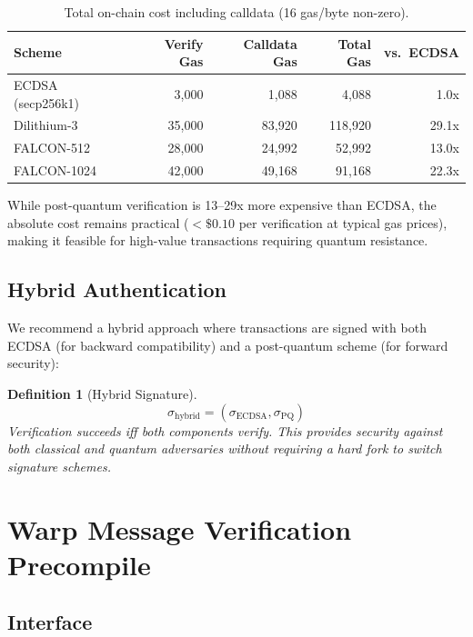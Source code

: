 \documentclass[11pt,a4paper]{article}
\newtheorem{definition}{Definition}
\begin{document}
\begin{table}[H]
\centering
\caption{Total on-chain cost including calldata (16 gas/byte non-zero).}
\label{tab:pq_total}
\begin{tabular}{lrrrr}
\toprule
\textbf{Scheme} & \textbf{Verify Gas} & \textbf{Calldata Gas} & \textbf{Total Gas} & \textbf{vs.\ ECDSA} \\
\midrule
ECDSA (secp256k1) & 3,000 & 1,088 & 4,088 & 1.0x \\
Dilithium-3 & 35,000 & 83,920 & 118,920 & 29.1x \\
FALCON-512 & 28,000 & 24,992 & 52,992 & 13.0x \\
FALCON-1024 & 42,000 & 49,168 & 91,168 & 22.3x \\
\bottomrule
\end{tabular}
\end{table}

While post-quantum verification is 13--29x more expensive than ECDSA, the absolute cost remains practical ($< \$0.10$ per verification at typical gas prices), making it feasible for high-value transactions requiring quantum resistance.

\subsection{Hybrid Authentication}

We recommend a hybrid approach where transactions are signed with both ECDSA (for backward compatibility) and a post-quantum scheme (for forward security):

\begin{definition}[Hybrid Signature]
\begin{equation}
    \sigma_{\text{hybrid}} = (\sigma_{\text{ECDSA}}, \sigma_{\text{PQ}})
\end{equation}
Verification succeeds iff both components verify. This provides security against both classical and quantum adversaries without requiring a hard fork to switch signature schemes.
\end{definition}

\section{Warp Message Verification Precompile}\label{sec:warp}

\subsection{Interface}
\end{document}
